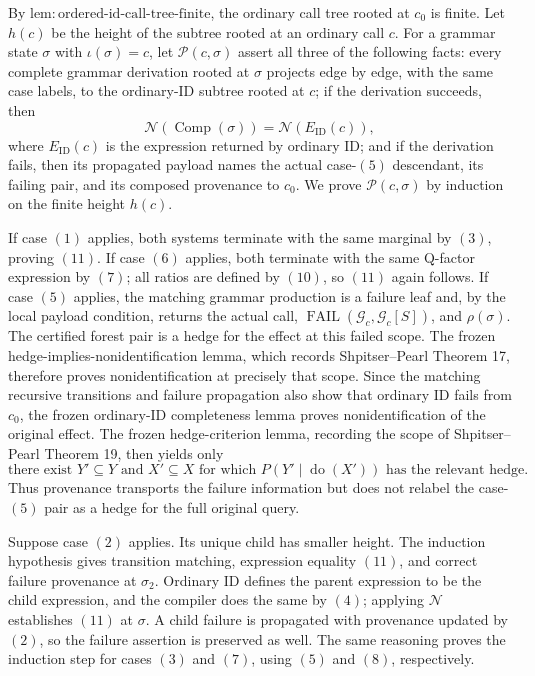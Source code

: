 By \(\mathrm{lem:ordered\text{-}id\text{-}call\text{-}tree\text{-}finite}\), the ordinary call tree rooted at \(c_0\) is finite.  Let \(h(c)\) be the height of the subtree rooted at an ordinary call \(c\).  For a grammar state \(\sigma\) with \(\iota(\sigma)=c\), let \(\mathcal P(c,\sigma)\) assert all three of the following facts: every complete grammar derivation rooted at \(\sigma\) projects edge by edge, with the same case labels, to the ordinary-ID subtree rooted at \(c\); if the derivation succeeds, then
\[
 \mathcal N(\operatorname{Comp}(\sigma))
 =\mathcal N(E_{\mathrm{ID}}(c)),
 \tag{11}
\]
where \(E_{\mathrm{ID}}(c)\) is the expression returned by ordinary ID; and if the derivation fails, then its propagated payload names the actual case-\((5)\) descendant, its failing pair, and its composed provenance to \(c_0\).  We prove \(\mathcal P(c,\sigma)\) by induction on the finite height \(h(c)\).

If case \((1)\) applies, both systems terminate with the same marginal by \((3)\), proving \((11)\).  If case \((6)\) applies, both terminate with the same Q-factor expression by \((7)\); all ratios are defined by \((10)\), so \((11)\) again follows.  If case \((5)\) applies, the matching grammar production is a failure leaf and, by the local payload condition, returns the actual call, \(\operatorname{FAIL}(\mathcal G_c,\mathcal G_c[S])\), and \(\rho(\sigma)\).  The certified forest pair is a hedge for the effect at this failed scope.  The frozen hedge-implies-nonidentification lemma, which records Shpitser--Pearl Theorem 17, therefore proves nonidentification at precisely that scope.  Since the matching recursive transitions and failure propagation also show that ordinary ID fails from \(c_0\), the frozen ordinary-ID completeness lemma proves nonidentification of the original effect.  The frozen hedge-criterion lemma, recording the scope of Shpitser--Pearl Theorem 19, then yields only
\[
 \text{there exist }Y'\subseteq Y\text{ and }X'\subseteq X
 \text{ for which }P(Y'\mid\operatorname{do}(X'))
 \text{ has the relevant hedge}.
 \tag{12}
\]
Thus provenance transports the failure information but does not relabel the case-\((5)\) pair as a hedge for the full original query.

Suppose case \((2)\) applies.  Its unique child has smaller height.  The induction hypothesis gives transition matching, expression equality \((11)\), and correct failure provenance at \(\sigma_2\).  Ordinary ID defines the parent expression to be the child expression, and the compiler does the same by \((4)\); applying \(\mathcal N\) establishes \((11)\) at \(\sigma\).  A child failure is propagated with provenance updated by \((2)\), so the failure assertion is preserved as well.  The same reasoning proves the induction step for cases \((3)\) and \((7)\), using \((5)\) and \((8)\), respectively.

